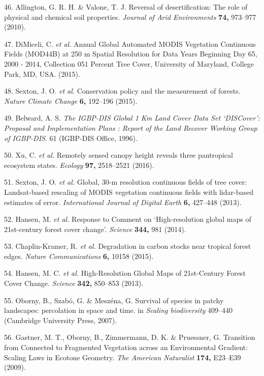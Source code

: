 \documentclass[]{article}
\begin{document}
\hypertarget{ref-Allington2010}{}
46. Allington, G. R. H. \& Valone, T. J. Reversal of desertification:
The role of physical and chemical soil properties. \emph{Journal of Arid
Environments} \textbf{74,} 973--977 (2010).

\hypertarget{ref-DiMiceli2015}{}
47. DiMiceli, C. \emph{et al.} Annual Global Automated MODIS Vegetation
Continuous Fields (MOD44B) at 250 m Spatial Resolution for Data Years
Beginning Day 65, 2000 - 2014, Collection 051 Percent Tree Cover,
University of Maryland, College Park, MD, USA. (2015).

\hypertarget{ref-Sexton2015}{}
48. Sexton, J. O. \emph{et al.} Conservation policy and the measurement
of forests. \emph{Nature Climate Change} \textbf{6,} 192--196 (2015).

\hypertarget{ref-Belward1996}{}
49. Belward, A. S. \emph{The IGBP-DIS Global 1 Km Land Cover Data Set
`DISCover': Proposal and Implementation Plans : Report of the Land
Recover Working Group of IGBP-DIS}. 61 (IGBP-DIS Office, 1996).

\hypertarget{ref-Xu2016}{}
50. Xu, C. \emph{et al.} Remotely sensed canopy height reveals three
pantropical ecosystem states. \emph{Ecology} \textbf{97,} 2518--2521
(2016).

\hypertarget{ref-Sexton2013}{}
51. Sexton, J. O. \emph{et al.} Global, 30-m resolution continuous
fields of tree cover: Landsat-based rescaling of MODIS vegetation
continuous fields with lidar-based estimates of error.
\emph{International Journal of Digital Earth} \textbf{6,} 427--448
(2013).

\hypertarget{ref-Hansen2014}{}
52. Hansen, M. \emph{et al.} Response to Comment on `High-resolution
global maps of 21st-century forest cover change'. \emph{Science}
\textbf{344,} 981 (2014).

\hypertarget{ref-Chaplin-Kramer2015}{}
53. Chaplin-Kramer, R. \emph{et al.} Degradation in carbon stocks near
tropical forest edges. \emph{Nature Communications} \textbf{6,} 10158
(2015).

\hypertarget{ref-Hansen2013}{}
54. Hansen, M. C. \emph{et al.} High-Resolution Global Maps of
21st-Century Forest Cover Change. \emph{Science} \textbf{342,} 850--853
(2013).

\hypertarget{ref-Oborny2007}{}
55. Oborny, B., Szabó, G. \& Meszéna, G. Survival of species in patchy
landscapes: percolation in space and time. in \emph{Scaling
biodiversity} 409--440 (Cambridge University Press, 2007).

\hypertarget{ref-Gastner2009}{}
56. Gastner, M. T., Oborny, B., Zimmermann, D. K. \& Pruessner, G.
Transition from Connected to Fragmented Vegetation across an
Environmental Gradient: Scaling Laws in Ecotone Geometry. \emph{The
American Naturalist} \textbf{174,} E23--E39 (2009).
\end{document}
